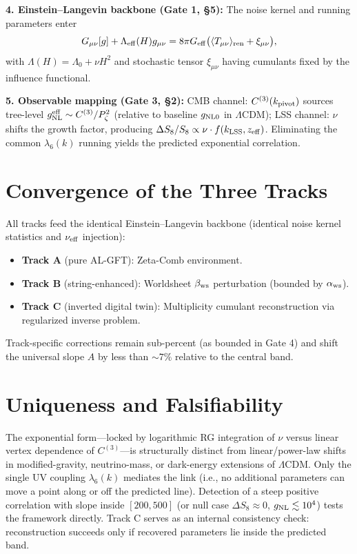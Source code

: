 \documentclass[12pt]{article}
\begin{document}
\noindent
\textbf{4. Einstein–Langevin backbone (Gate 1, §5):} The noise kernel and running parameters enter
\[
G_{\mu\nu}[g] + \Lambda_{\rm eff}(H) g_{\mu\nu} = 8\pi G_{\rm eff} \bigl(\langle T_{\mu\nu}\rangle_{\rm ren} + \xi_{\mu\nu}\bigr),
\]
with \(\Lambda(H) = \Lambda_0 + \nu H^2\) and stochastic tensor \(\xi_{\mu\nu}\) having cumulants fixed by the influence functional.

\noindent
\textbf{5. Observable mapping (Gate 3, §2):} CMB channel: \(C^{(3)}(k_{\rm pivot})\) sources tree-level \(g_{\rm NL}^{\rm eff} \sim C^{(3)}/P_\zeta^2\) (relative to baseline \(g_{\rm NL0}\) in \(\Lambda\)CDM); LSS channel: \(\nu\) shifts the growth factor, producing \(\Delta S_8/S_8 \propto \nu \cdot f(k_{\rm LSS}, z_{\rm eff})\). Eliminating the common \(\lambda_6(k)\) running yields the predicted exponential correlation.

\section{Convergence of the Three Tracks}
All tracks feed the identical Einstein–Langevin backbone (identical noise kernel statistics and \(\nu_{\rm eff}\) injection):
\begin{itemize}
    \item \textbf{Track A} (pure AL-GFT): Zeta-Comb environment.
    \item \textbf{Track B} (string-enhanced): Worldsheet \(\beta_{\rm ws}\) perturbation (bounded by \(\alpha_{\rm ws}\)).
    \item \textbf{Track C} (inverted digital twin): Multiplicity cumulant reconstruction via regularized inverse problem.
\end{itemize}
Track-specific corrections remain sub-percent (as bounded in Gate 4) and shift the universal slope \(A\) by less than \(\sim 7\%\) relative to the central band.

\section{Uniqueness and Falsifiability}
The exponential form---locked by logarithmic RG integration of \(\nu\) versus linear vertex dependence of \(C^{(3)}\)---is structurally distinct from linear/power-law shifts in modified-gravity, neutrino-mass, or dark-energy extensions of \(\Lambda\)CDM. Only the single UV coupling \(\lambda_6(k)\) mediates the link (i.e., no additional parameters can move a point along or off the predicted line). Detection of a steep positive correlation with slope inside \([200, 500]\) (or null case \(\Delta S_8 \approx 0\), \(g_{\rm NL} \lesssim 10^4\)) tests the framework directly. Track C serves as an internal consistency check: reconstruction succeeds only if recovered parameters lie inside the predicted band.
\end{document}
